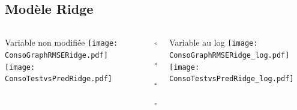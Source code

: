 \documentclass[8pt,aspectratio=169,hyperref={unicode=true}]{beamer}
\begin{document}
\subsection{Modèle Ridge}
\begin{frame}{\insertsubsection}
  \begin{columns}[t]
    \begin{column}{.31\textwidth}
      \centering Variable non modifiée
      \texttt{[image: ConsoGraphRMSERidge.pdf]}
      \texttt{[image: ConsoTestvsPredRidge.pdf]}
    \end{column}
    \begin{column}{.38\textwidth}
      $\Longleftarrow$

      \scriptsize
      {\centering 
        }
      

      \normalsize
      $\Longleftarrow$

      \raggedleft $\Longrightarrow$

      \scriptsize
      {\centering
        }
      

      \normalsize
      $\Longrightarrow$
    \end{column}
    \begin{column}{.31\textwidth}
      \centering Variable au log
      \texttt{[image: ConsoGraphRMSERidge\_log.pdf]}
      \texttt{[image: ConsoTestvsPredRidge\_log.pdf]}
    \end{column}
  \end{columns}
\end{frame}
\end{document}
